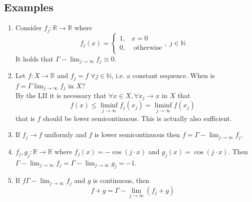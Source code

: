 \documentclass[a4paper, 12pt]{article}
\theoremstyle{plain}
\theoremstyle{definition}
\theoremstyle{lemma}
\theoremstyle{remark}
\theoremstyle{corollary}
\theoremstyle{example}
\begin{document}
\subsection{Examples}
	\begin{enumerate}
		\item Consider $f_j: \mathbb{R} \to \mathbb{R}$ where \[f_j(x) = \begin{cases}
			1, & x = 0\\
			0, & \text{ otherwise}
		\end{cases}, \; j \in \mathbb{N}\]
		It holds that $\Gamma-\lim_{j \to \infty} f_j \equiv 0$.
		\item Let $f: X \to \mathbb{R}$ and $f_j = f$ $\forall j \in \mathbb{N}$, i.e. a constant sequence. When is $f = \Gamma\lim_{j \to \infty} f_j$ in $X$?\\
		By the LII it is necessary that $\forall x \in X, \forall x_j \to x$ in $X$ that \[f(x) \leq \liminf_{j \to \infty} f_j(x_j) = \liminf_{j \to \infty}f(x_j)\] that is $f$ should be lower semicontinuous. This is actually also sufficient.
		\item If $f_j \to f$ uniformly and $f$ is lower semicontinuous then $f = \Gamma-\lim_{j \to \infty} f_j$.
		\item $f_j,g_j: \mathbb{R} \to \mathbb{R}$ where $f_j(x) = -\cos(j\cdot x)$ and $g_j(x) = \cos(j \cdot x)$. Then $\Gamma-\lim_{j \to \infty}f_j = \Gamma-\lim_{j \to \infty} g_j = -1$.
		\item If $f  \Gamma-\lim_{j \to \infty} f_j$ and $g$ is continuous, then \[f+g = \Gamma-\lim_{j \to \infty} (f_j+g)\]
	\end{enumerate}
\end{document}
